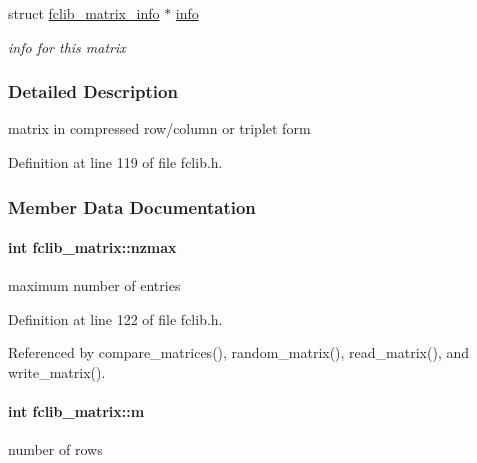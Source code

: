 \begin{DoxyCompactItemize}
struct \hyperlink{structfclib__matrix__info}{fclib\+\_\+matrix\+\_\+info} $\ast$ \hyperlink{structfclib__matrix_ac0af227334c5b0a13a3222c8f04add36}{info}
\begin{DoxyCompactList}\small\item\em info for this matrix \end{DoxyCompactList}\end{DoxyCompactItemize}


\subsubsection{Detailed Description}
matrix in compressed row/column or triplet form 

Definition at line 119 of file fclib.\+h.



\subsubsection{Member Data Documentation}
\hypertarget{structfclib__matrix_ad59323011143dc70ef74f4377279e0d0}{}
\paragraph[{nzmax}]{\setlength{\rightskip}{0pt plus 5cm}int fclib\+\_\+matrix\+::nzmax}\label{structfclib__matrix_ad59323011143dc70ef74f4377279e0d0}


maximum number of entries 



Definition at line 122 of file fclib.\+h.



Referenced by compare\+\_\+matrices(), random\+\_\+matrix(), read\+\_\+matrix(), and write\+\_\+matrix().

\hypertarget{structfclib__matrix_aaec2a835fcc339c3fb84227e2f7b861b}{}
\paragraph[{m}]{\setlength{\rightskip}{0pt plus 5cm}int fclib\+\_\+matrix\+::m}\label{structfclib__matrix_aaec2a835fcc339c3fb84227e2f7b861b}


number of rows 



